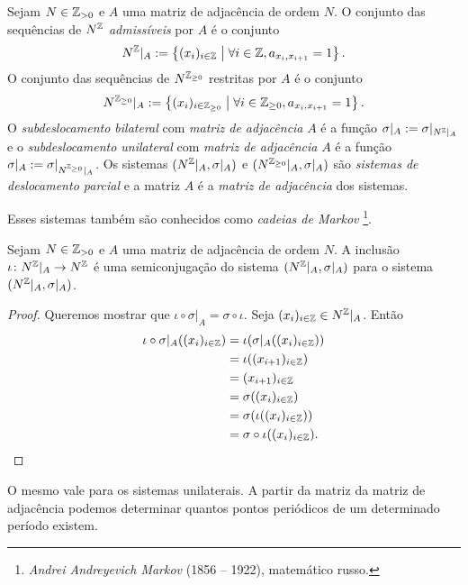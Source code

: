 \begin{definition}
Sejam $N \in \mathbb{Z}_{>0}$ e $A$ uma matriz de adjacência de ordem $N$. O conjunto das sequências de $N^{\mathbb{Z}}$ \emph{admissíveis} por $A$ é o conjunto
	\begin{equation*}
	N^{\mathbb{Z}}|_A := \left\{{(x_i)_{i \in \mathbb{Z}}}\;\middle\vert\;{\forall i \in \mathbb{Z}, a_{x_i,x_{i+1}}=1}\right\}.
	\end{equation*}
O conjunto das sequências de $N^{\mathbb{Z}_{\geq 0}}$ restritas por $A$ é o conjunto
	\begin{equation*}
	N^{\mathbb{Z}_{\geq 0}}|_A := \left\{{(x_i)_{i \in {\mathbb{Z}_{\geq 0}}}}\;\middle\vert\;{\forall i \in {\mathbb{Z}_{\geq 0}}, a_{x_i,x_{i+1}}=1}\right\}.
	\end{equation*}
O \emph{subdeslocamento bilateral} com \emph{matriz de adjacência} $A$ é a função $\sigma|_A := \sigma|_{N^{\mathbb{Z}}|_A}$ e o \emph{subdeslocamento unilateral} com \emph{matriz de adjacência} $A$ é a função $\sigma|_A := \sigma|_{N^{\mathbb{Z}_{\geq 0}}|_A}$. Os sistemas $(N^{\mathbb{Z}}|_A,\sigma|_A)$ e $(N^{\mathbb{Z}_{\geq 0}}|_A,\sigma|_A)$ são \emph{sistemas de deslocamento parcial} e a matriz $A$ é a \emph{matriz de adjacência} dos sistemas.
\end{definition}

Esses sistemas também são conhecidos como \emph{cadeias de Markov} \footnote{\emph{Andrei Andreyevich Markov} (1856 -- 1922), matemático russo.}.

\begin{proposition}
Sejam $N \in \mathbb{Z}_{>0}$ e $A$ uma matriz de adjacência de ordem $N$. A inclusão $\iota\colon N^{\mathbb{Z}}|_A \to N^{\mathbb{Z}}$ é uma semiconjugação do sistema $(N^{\mathbb{Z}}|_A,\sigma|_A)$ para o sistema $(N^{\mathbb{Z}}|_A,\sigma|_A)$.
\end{proposition}
\begin{proof}
Queremos mostrar que $\iota \circ \sigma|_A = \sigma \circ \iota$. Seja $(x_i)_{i \in \mathbb{Z}} \in N^{\mathbb{Z}}|_A$. Então
	\begin{align*}
	\iota \circ \sigma|_A ((x_i)_{i \in \mathbb{Z}}) &= \iota (\sigma|_A((x_i)_{i \in \mathbb{Z}})) \\
		&= \iota((x_{i+1})_{i \in \mathbb{Z}}) \\
		&= (x_{i+1})_{i \in \mathbb{Z}} \\
		&= \sigma ((x_i)_{i \in \mathbb{Z}}) \\
		&= \sigma (\iota((x_i)_{i \in \mathbb{Z}})) \\
		& =\sigma \circ \iota ((x_i)_{i \in \mathbb{Z}}).
	\end{align*}
\end{proof}

O mesmo vale para os sistemas unilaterais. A partir da matriz da matriz de adjacência podemos determinar quantos pontos periódicos de um determinado período existem.

